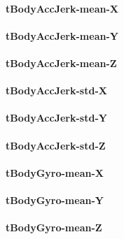 \documentclass[
]{article}
\begin{document}
\hypertarget{tbodyaccjerk-mean-x}{%
\paragraph{tBodyAccJerk-mean-X}\label{tbodyaccjerk-mean-x}}

\hypertarget{tbodyaccjerk-mean-y}{%
\paragraph{tBodyAccJerk-mean-Y}\label{tbodyaccjerk-mean-y}}

\hypertarget{tbodyaccjerk-mean-z}{%
\paragraph{tBodyAccJerk-mean-Z}\label{tbodyaccjerk-mean-z}}

\hypertarget{tbodyaccjerk-std-x}{%
\paragraph{tBodyAccJerk-std-X}\label{tbodyaccjerk-std-x}}

\hypertarget{tbodyaccjerk-std-y}{%
\paragraph{tBodyAccJerk-std-Y}\label{tbodyaccjerk-std-y}}

\hypertarget{tbodyaccjerk-std-z}{%
\paragraph{tBodyAccJerk-std-Z}\label{tbodyaccjerk-std-z}}

\hypertarget{tbodygyro-mean-x}{%
\paragraph{tBodyGyro-mean-X}\label{tbodygyro-mean-x}}

\hypertarget{tbodygyro-mean-y}{%
\paragraph{tBodyGyro-mean-Y}\label{tbodygyro-mean-y}}

\hypertarget{tbodygyro-mean-z}{%
\paragraph{tBodyGyro-mean-Z}\label{tbodygyro-mean-z}}
\end{document}
